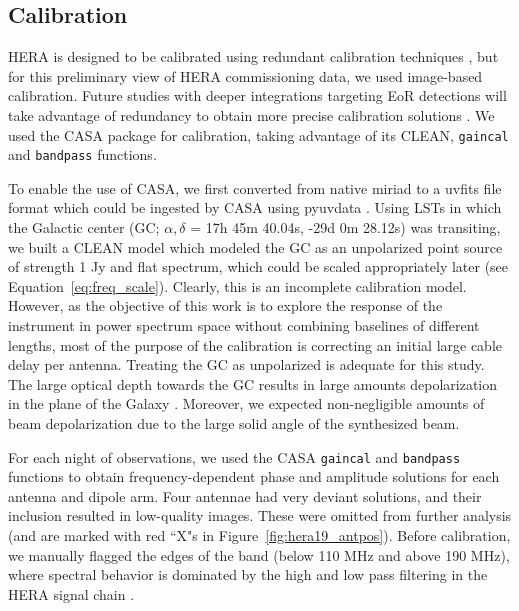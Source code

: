 \subsection{Calibration}
\label{subsec:hera19_cal}

HERA is designed to be calibrated using redundant calibration techniques \citep{Dillon.16}, but for this preliminary view of HERA commissioning data, we used image-based calibration. Future studies with deeper integrations targeting EoR detections will take advantage of redundancy to obtain more precise calibration solutions \citep{deBoer.17}. We used the {\sc CASA} \citep{casa} package for calibration, taking advantage of its CLEAN, {\tt gaincal} and {\tt bandpass} functions.

To enable the use of {\sc CASA}, we first converted from native {\sc miriad} to a {\sc uvfits} file format which could be ingested by {\sc CASA} using {\sc pyuvdata} \citep{pyuvdata}. 
Using LSTs in which the Galactic center (GC; $\alpha, \delta$ = 17h 45m 40.04s,​ ​-29d 0m 28.12s) was transiting, we built a CLEAN model which modeled the GC as an unpolarized point source of strength 1 Jy and flat spectrum, which could be scaled appropriately later (see Equation~\ref{eq:freq_scale}). 
Clearly, this is an incomplete calibration model. However, as the objective of this work is to explore the response of the instrument in power spectrum space without combining baselines of different lengths, most of the purpose of the calibration is correcting an initial large cable delay per antenna. 
Treating the GC as unpolarized is adequate for this study. The large optical depth towards the GC \citep{Oppermann.12} results in large amounts depolarization in the plane of the Galaxy \citep{Wolleben.06}. Moreover, we expected non-negligible amounts of beam depolarization due to the large solid angle of the synthesized beam.

For each night of observations, we used the {\sc CASA} {\tt gaincal} and {\tt bandpass} functions to obtain frequency-dependent phase and amplitude solutions for each antenna and dipole arm. Four antennae had very deviant solutions, and their inclusion resulted in low-quality images. These were omitted from further analysis (and are marked with red ``X"s in Figure~\ref{fig:hera19_antpos}).  Before calibration, we manually flagged the edges of the band (below 110 MHz and above 190 MHz), where spectral behavior is dominated by the high and low pass filtering in the HERA signal chain \citep{deBoer.17}.

